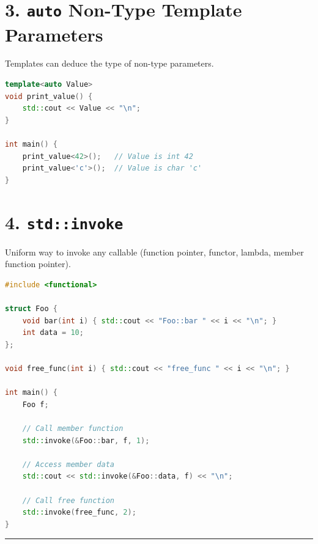 \hypertarget{auto-non-type-template-parameters}{%
\section{\texorpdfstring{3. \texttt{auto} Non-Type Template
Parameters}{3. auto Non-Type Template Parameters}}\label{auto-non-type-template-parameters}}

Templates can deduce the type of non-type parameters.

\begin{lstlisting}[language={C++}]
template<auto Value>
void print_value() {
    std::cout << Value << "\n";
}

int main() {
    print_value<42>();   // Value is int 42
    print_value<'c'>();  // Value is char 'c'
}
\end{lstlisting}

\hypertarget{stdinvoke}{%
\section{\texorpdfstring{4.
\texttt{std::invoke}}{4. std::invoke}}\label{stdinvoke}}

Uniform way to invoke any callable (function pointer, functor, lambda,
member function pointer).

\begin{lstlisting}[language={C++}]
#include <functional>

struct Foo {
    void bar(int i) { std::cout << "Foo::bar " << i << "\n"; }
    int data = 10;
};

void free_func(int i) { std::cout << "free_func " << i << "\n"; }

int main() {
    Foo f;
    
    // Call member function
    std::invoke(&Foo::bar, f, 1); 
    
    // Access member data
    std::cout << std::invoke(&Foo::data, f) << "\n";
    
    // Call free function
    std::invoke(free_func, 2);
}
\end{lstlisting}

\begin{center}\rule{0.5\linewidth}{0.5pt}\end{center}
